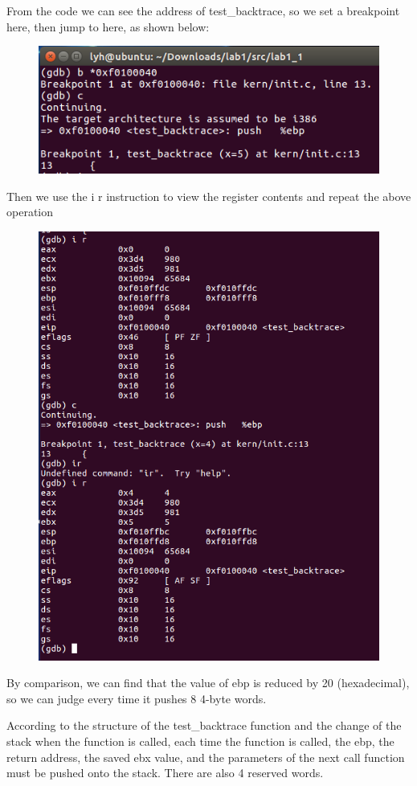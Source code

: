From the code we can see the address of test\_backtrace, so we set a breakpoint here, then jump to here, as shown below:
\begin{figure}[H]
  \centering
  \includegraphics[width=0.8\linewidth]{figure/backtrace_set_breakpoint}
\end{figure}
Then we use the i r instruction to view the register contents and repeat the above operation
\begin{figure}[H]
  \centering
  \includegraphics[width=0.8\linewidth]{figure/test_backtrace_c}
\end{figure}

By comparison, we can find that the value of ebp is reduced by 20 (hexadecimal), so we can judge every time it pushes 8 4-byte words.

According to the structure of the test\_backtrace function and the change of the stack when the function is called, each time the function is called, the ebp, the return address, the saved ebx value, and the parameters of the next call function must be pushed onto the stack. There are also 4 reserved words.

